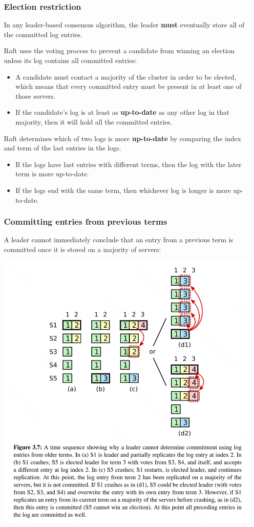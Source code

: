 \documentclass[11pt]{article}
\begin{document}
\subsubsection{Election restriction}
\label{sec:org1943379}
In any leader-based consensus algorithm, the leader \textbf{must} eventually store all of the committed log
entries.

Raft uses the voting process to prevent a candidate from winning an election unless its log contains
all committed entries:
\begin{itemize}
\item A candidate must contact a majority of the cluster in order to be elected, which means that every
committed entry must be present in at least one of those servers.
\item If the candidate's log is at least as \textbf{up-to-date} as any other log in that majority, then it will
hold all the committed entries.
\end{itemize}

Raft determines which of two logs is more \textbf{up-to-date} by comparing the index and term of the last
entries in the logs.
\begin{itemize}
\item If the logs have last entries with different terms, then the log with the later term is more up-to-date.
\item If the logs end with the same term, then whichever log is longer is more up-to-date.
\end{itemize}
\subsubsection{Committing entries from previous terms}
\label{sec:orga5a820e}
A leader cannot immediately conclude that an entry from a previous term is committed once it is stored
on a majority of servers:
\begin{center}
\includegraphics[width=.9\textwidth]{../../images/papers/12.png}
\label{3.7}
\end{center}
\end{document}
